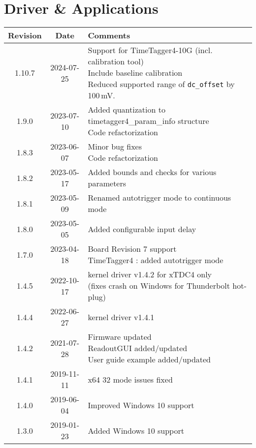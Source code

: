 \section{Driver \& Applications} \label{sec:rev_driver_applications}
\begin{tabularx}{\textwidth}{|c|c|X|}
    \hline
    Revision & Date & Comments\\
    \hline\hline
    \hypertarget{drvrev}{1.10.7} & 2024-07-25 &
    \makecell[l] {
        Support for TimeTagger4-10G (incl. calibration tool)\\*
        Include baseline calibration\\*
        Reduced supported range of \texttt{dc\_offset} by 100\,mV.
    }\\   
    \hline
    1.9.0 & 2023-07-10 &
    \makecell[l] {
       Added quantization to timetagger4\_param\_info structure \\*
       Code refactorization\\*   
    }\\   
    \hline
    {1.8.3} & 2023-06-07 &
    \makecell[l] {
        Minor bug fixes\\*
        Code refactorization\\*        
    }\\
    \hline
    {1.8.2} & 2023-05-17 &
    \makecell[l] {
        Added bounds and checks for various parameters\\*         
    }\\
    \hline
    {1.8.1} & 2023-05-09 &
    \makecell[l] {
     Renamed autotrigger mode to continuous mode  \\*  
    }\\
    \hline
    {1.8.0} & 2023-05-05 &
    \makecell[l] {
        Added configurable input delay\\*
    }\\
    \hline
    {1.7.0} & 2023-04-18 &
    \makecell[l] {
        Board Revision 7 support\\* 
        TimeTagger4 : added autotrigger mode\\*
    }\\
    \hline
    {1.4.5} & 2022-10-17 &
    \makecell[l] {
        kernel driver v1.4.2 for xTDC4 only\\* 
        (fixes crash on Windows for Thunderbolt hot-plug)\\*
    }\\
    \hline
    {1.4.4} & 2022-06-27 &
        kernel driver v1.4.1\\
    \hline
    1.4.2 & 2021-07-28 &
    \makecell[l]{
        Firmware updated \\*
        ReadoutGUI added/updated \\*
        User guide example added/updated \\*
    }\\
    \hline
    {1.4.1} & 2019-11-11 & x64 32 mode issues fixed\\
    \hline
    {1.4.0} & 2019-06-04 & Improved Windows 10 support\\
    \hline
    {1.3.0} & 2019-01-23 & Added Windows 10 support\\
    \hline
\end{tabularx}
